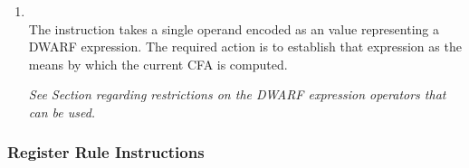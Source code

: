 \begin{enumerate}[1. ]
\item \textbf{\DWCFAdefcfaexpressionTARG} \\
The \DWCFAdefcfaexpressionNAME{} instruction takes a 
single operand encoded as 
\bb
an \CLASSexprval{}
\eb
value representing a
DWARF expression. The required action is to establish that
expression as the means by which the current CFA is computed.

\textit{See Section  
regarding restrictions on the DWARF
expression operators that can be used.}

\end{enumerate}

\subsubsection{Register Rule Instructions}
\label{chap:registerruleinstructions}

